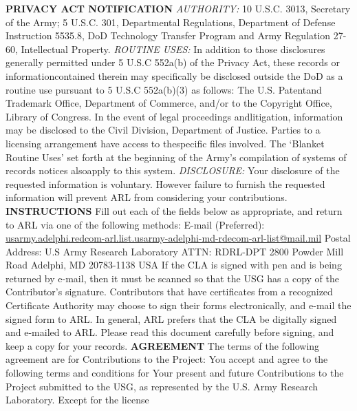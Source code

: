 \documentclass[8pt]{article}
\begin{document}
\begin{Form}
\textbf{PRIVACY ACT NOTIFICATION} \break \break \emph{AUTHORITY:} 10 U.S.C. 3013, 
Secretary of the Army; 5 U.S.C. 301,
Departmental Regulations, Department of Defense Instruction 5535.8, DoD
Technology Transfer Program and Army Regulation 27-60, Intellectual
Property.
\break \break
\emph{ROUTINE USES:} In addition to those disclosures generally
permitted under 5 U.S.C 552a(b) of the Privacy Act, these records or
informationcontained therein may specifically be disclosed outside the
DoD as a routine use pursuant to 5 U.S.C 552a(b)(3) as follows: The U.S.
Patentand Trademark Office, Department of Commerce, and/or to the
Copyright Office, Library of Congress. In the event of legal proceedings
andlitigation, information may be disclosed to the Civil Division,
Department of Justice. Parties to a licensing arrangement have access to
thespecific files involved. The `Blanket Routine Uses' set forth at the
beginning of the Army's compilation of systems of records notices
alsoapply to this system.
\break \break
\emph{DISCLOSURE:} Your disclosure of the requested information is
voluntary. However failure to furnish the requested information will
prevent ARL from considering your contributions.
\break \break
\textbf{INSTRUCTIONS} \break \break
Fill out each of the fields below as appropriate, and return to ARL via
one of the following methods: \break \break
E-mail (Preferred): \href{mailto:usarmy.adelphi.rdecom-arl.list.usarmy-adelphi-md-rdecom-arl-list@mail.mil?subject=RE%20Contribution}{usarmy.adelphi.redcom-arl.list.usarmy-adelphi-md-rdecom-arl-list@mail.mil}\break \break
Postal Address: U.S Army Research Laboratory \break
                ATTN: RDRL-DPT 2800 Powder Mill Road \break
                Adelphi, MD 20783-1138 \break
                USA
\break \break
If the CLA is signed with pen and is being returned by e-mail, then it
must be scanned so that the USG has a copy of the Contributor's
signature. Contributors that have certificates from a recognized
Certificate Authority may choose to sign their forms electronically, and
e-mail the signed form to ARL. In general, ARL prefers that the CLA be
digitally signed and e-mailed to ARL.
\break \break
Please read this document carefully before signing, and keep a copy for
your records.
\break \break
\textbf{AGREEMENT}
\break \break
The terms of the following agreement are for Contributions to the
Project:
\break \break
{}
\break \break
You accept and agree to the following terms and conditions for Your
present and future Contributions to the Project submitted to the USG, as
represented by the U.S. Army Research Laboratory. Except for the license

\end{Form}
\end{document}

